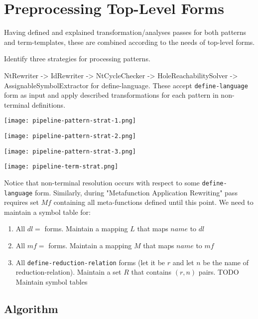\section{Preprocessing Top-Level Forms}

Having defined and explained transformation/analyses passes for both patterns and term-templates, these are combined according to the needs of top-level forms. 

Identify three strategies for processing patterns.

NtRewriter -> IdRewriter -> NtCycleChecker -> HoleReachabilitySolver -> AssignableSymbolExtractor for define-language. These accept \lstinline{define-language} form as input and apply described transformations for each pattern in non-terminal definitions.

\texttt{[image: pipeline-pattern-strat-1.png]}

\texttt{[image: pipeline-pattern-strat-2.png]}

\texttt{[image: pipeline-pattern-strat-3.png]}

\texttt{[image: pipeline-term-strat.png]}


Notice that non-terminal resolution occurs with respect to some \lstinline{define-language} form. Similarly, during "Metafunction Application Rewriting" pass requires set $Mf$ containing all meta-functions defined until this point. We need to maintain a symbol table for:

\begin{enumerate}
\item All $dl =$ \DefineLanguage forms. Maintain a mapping $L$ that maps $name$ to $dl$
\item All $mf =$ \DefineMetafunction forms. Maintain a mapping $M$ that maps $name$ to $mf$
\item All \lstinline{define-reduction-relation} forms (let it be $r$ and let $n$ be the name of reduction-relation). Maintain a set $R$ that contains $(r, n)$ pairs.
TODO Maintain symbol tables
\end{enumerate}

\subsection{Algorithm}

